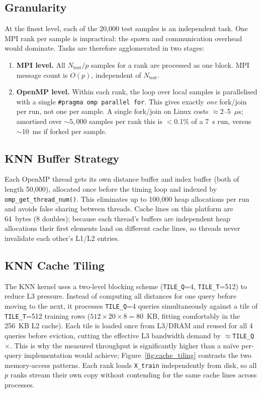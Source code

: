 \documentclass[12pt,a4paper]{article}
\begin{document}
\subsection{Granularity}

At the finest level, each of the 20{,}000 test samples is an independent task.
One MPI rank per sample is impractical: the spawn and communication overhead
would dominate. Tasks are therefore agglomerated in two stages:

\begin{enumerate}
  \item \textbf{MPI level.} All $N_\text{test}/p$ samples for a rank are
        processed as one block. MPI message count is $O(p)$, independent
        of $N_\text{test}$.
  \item \textbf{OpenMP level.} Within each rank, the loop over local samples
        is parallelised with a single \texttt{\#pragma omp parallel for}.
        This gives exactly \emph{one} fork/join per run, not one per sample.
        A single fork/join on Linux costs $\approx$2--5~$\mu$s; amortised
        over ${\sim}5{,}000$ samples per rank this is $<$0.1\% of a 7~s run,
        versus ${\sim}10$~ms if forked per sample.
\end{enumerate}

\subsection{KNN Buffer Strategy}

Each OpenMP thread gets its own distance buffer and index buffer (both of
length 50{,}000), allocated once before the timing loop and indexed by
\texttt{omp\_get\_thread\_num()}. This eliminates up to 100{,}000 heap
allocations per run and avoids false sharing between threads. Cache lines
on this platform are 64~bytes (8 doubles); because each thread's buffers
are independent heap allocations their first elements land on different
cache lines, so threads never invalidate each other's L1/L2 entries.

\subsection{KNN Cache Tiling}

The KNN kernel uses a two-level blocking scheme (\texttt{TILE\_Q}=4,
\texttt{TILE\_T}=512) to reduce L3 pressure. Instead of computing all
distances for one query before moving to the next, it processes
\texttt{TILE\_Q}=4 queries simultaneously against a tile of
\texttt{TILE\_T}=512 training rows ($512 \times 20 \times 8 = 80$~KB,
fitting comfortably in the 256~KB L2 cache). Each tile is loaded once
from L3/DRAM and reused for all 4 queries before eviction, cutting the
effective L3 bandwidth demand by ${\approx}$\texttt{TILE\_Q}$\times$.
This is why the measured throughput is significantly higher than a
naïve per-query implementation would achieve;
Figure~\ref{fig:cache_tiling} contrasts the two memory-access patterns.
Each rank loads \texttt{X\_train} independently from disk, so all $p$ ranks
stream their own copy without contending for the same cache lines across
processes.
\end{document}
